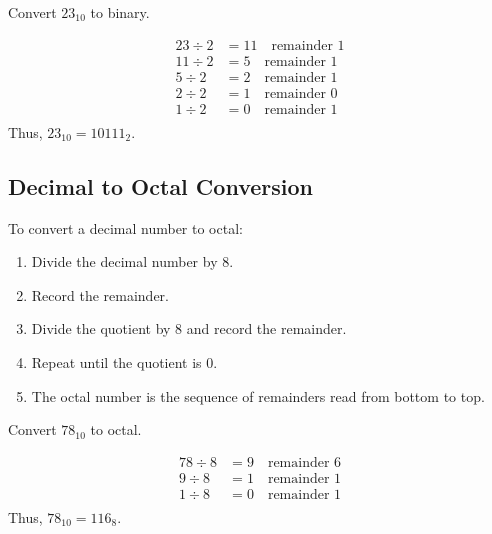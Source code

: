 \begin{example} Convert \(23_{10}\) to binary.

\begin{solution}

\[
\begin{aligned}
23 \div 2 & = 11 \quad \text{remainder } 1 \\
11 \div 2 & = 5 \quad \text{remainder } 1 \\
5 \div 2 & = 2 \quad \text{remainder } 1 \\
2 \div 2 & = 1 \quad \text{remainder } 0 \\
1 \div 2 & = 0 \quad \text{remainder } 1 \\
\end{aligned}
\]
Thus, \(23_{10} = 10111_2\). \end{solution}
\end{example}

\subsection*{Decimal to Octal Conversion}
To convert a decimal number to octal:
\begin{enumerate}
    \item Divide the decimal number by 8.
    \item Record the remainder.
    \item Divide the quotient by 8 and record the remainder.
    \item Repeat until the quotient is 0.
    \item The octal number is the sequence of remainders read from bottom to top.
\end{enumerate}

\begin{example}Convert \(78_{10}\) to octal.

\begin{solution}
    


\[
\begin{aligned}
78 \div 8 & = 9 \quad \text{remainder } 6 \\
9 \div 8 & = 1 \quad \text{remainder } 1 \\
1 \div 8 & = 0 \quad \text{remainder } 1 \\
\end{aligned}
\]
Thus, \(78_{10} = 116_8\). \end{solution}
    
\end{example}

